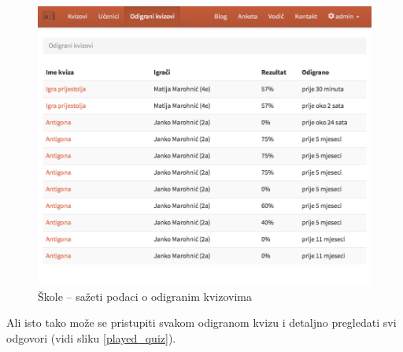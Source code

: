 \documentclass[11pt]{scrreprt}
\begin{document}
\begin{figure}[H]
  \includegraphics[width=\textwidth, clip=true, trim=0 10cm 0 0, fbox]{school/played_quizzes}
  \caption{Škole -- sažeti podaci o odigranim kvizovima}
  \label{played_quizzes}
\end{figure}

Ali isto tako može se pristupiti svakom odigranom kvizu i detaljno pregledati
svi odgovori (vidi sliku \ref{played_quiz}).
\end{document}
